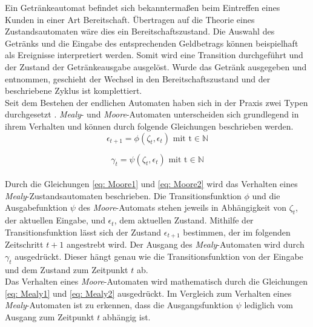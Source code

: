 	Ein Getränkeautomat befindet sich bekanntermaßen beim Eintreffen eines Kunden in einer Art Bereitschaft. Übertragen auf die Theorie eines Zustandsautomaten wäre dies ein Bereitschaftszustand. Die Auswahl des Getränks und die Eingabe des entsprechenden Geldbetrags können beispielhaft als Ereignisse interpretiert werden. Somit wird eine Transition durchgeführt und der Zustand der Getränkeausgabe ausgelöst. Wurde das Getränk ausgegeben und entnommen, geschieht der Wechsel in den Bereitschaftszustand und der beschriebene Zyklus ist komplettiert.\\
	
	Seit dem Bestehen der endlichen Automaten haben sich in der Praxis zwei Typen durchgesetzt \cite{mooremealy}. \textit{Mealy}- und \textit{Moore}-Automaten unterscheiden sich grundlegend in ihrem Verhalten und können durch folgende Gleichungen beschrieben werden.\\
	
	\begin{equation}
		\epsilon_{t+1}=\phi(\zeta_t,\epsilon_t)\text{    mit    t}\in\mathbb{N}
		\label{eq: Moore1}
	\end{equation}

	\begin{equation}
		\gamma_t=\psi(\zeta_t,\epsilon_t)\text{    mit    t}\in\mathbb{N}
		\label{eq: Moore2}
	\end{equation}
	\\
	Durch die Gleichungen \ref{eq: Moore1} und \ref{eq: Moore2} wird das Verhalten eines \textit{Mealy}-Zustandsautomaten beschrieben. Die Transitionsfunktion $\phi$ und die Ausgabefunktion $\psi$ des \textit{Moore}-Automats stehen jeweils in Abhängigkeit von $\zeta_t $, der aktuellen Eingabe, und $\epsilon_t$, dem aktuellen Zustand. Mithilfe der Transitionsfunktion lässt sich der Zustand $\epsilon_{t+1}$ bestimmen, der im folgenden Zeitschritt $t+1$ angestrebt wird. Der Ausgang des \textit{Mealy}-Automaten wird durch $\gamma_t$ ausgedrückt. Dieser hängt genau wie die Transitionsfunktion von der Eingabe und dem Zustand zum Zeitpunkt $t$ ab.\\
	
	Das Verhalten eines \textit{Moore}-Automaten wird mathematisch durch die Gleichungen \ref{eq: Mealy1} und \ref{eq: Mealy2} ausgedrückt. Im Vergleich zum Verhalten eines \textit{Mealy}-Automaten ist zu erkennen, dass die Ausgangsfunktion $\psi$ lediglich vom Ausgang zum Zeitpunkt $t$ abhängig ist.  \cite{mooremealy}\\
	

